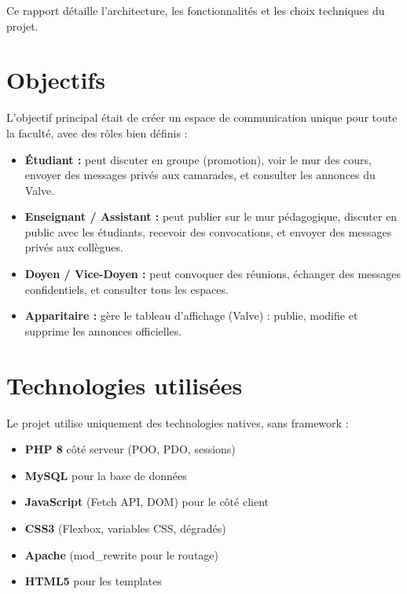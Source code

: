 \documentclass[12pt,a4paper]{article}
\begin{document}
\noindent Ce rapport d\'etaille l'architecture, les fonctionnalit\'es et les
choix techniques du projet.

\section{Objectifs}

L'objectif principal \'etait de cr\'eer un espace de communication unique pour
toute la facult\'e, avec des r\^oles bien d\'efinis :

\begin{itemize}
    \item \textbf{\'Etudiant :} peut discuter en groupe (promotion), voir le
    mur des cours, envoyer des messages priv\'es aux camarades, et consulter
    les annonces du Valve.
    \item \textbf{Enseignant / Assistant :} peut publier sur le mur
    p\'edagogique, discuter en public avec les \'etudiants, recevoir des
    convocations, et envoyer des messages priv\'es aux coll\`egues.
    \item \textbf{Doyen / Vice-Doyen :} peut convoquer des r\'eunions,
    \'echanger des messages confidentiels, et consulter tous les espaces.
    \item \textbf{Apparitaire :} g\`ere le tableau d'affichage (Valve) :
    publie, modifie et supprime les annonces officielles.
\end{itemize}

\section{Technologies utilis\'ees}

Le projet utilise uniquement des technologies natives, sans framework :

\begin{itemize}
    \item \textbf{PHP 8} c\^ot\'e serveur (POO, PDO, sessions)
    \item \textbf{MySQL} pour la base de donn\'ees
    \item \textbf{JavaScript} (Fetch API, DOM) pour le c\^ot\'e client
    \item \textbf{CSS3} (Flexbox, variables CSS, d\'egrad\'es)
    \item \textbf{Apache} (mod\_rewrite pour le routage)
    \item \textbf{HTML5} pour les templates
\end{itemize}
\end{document}
